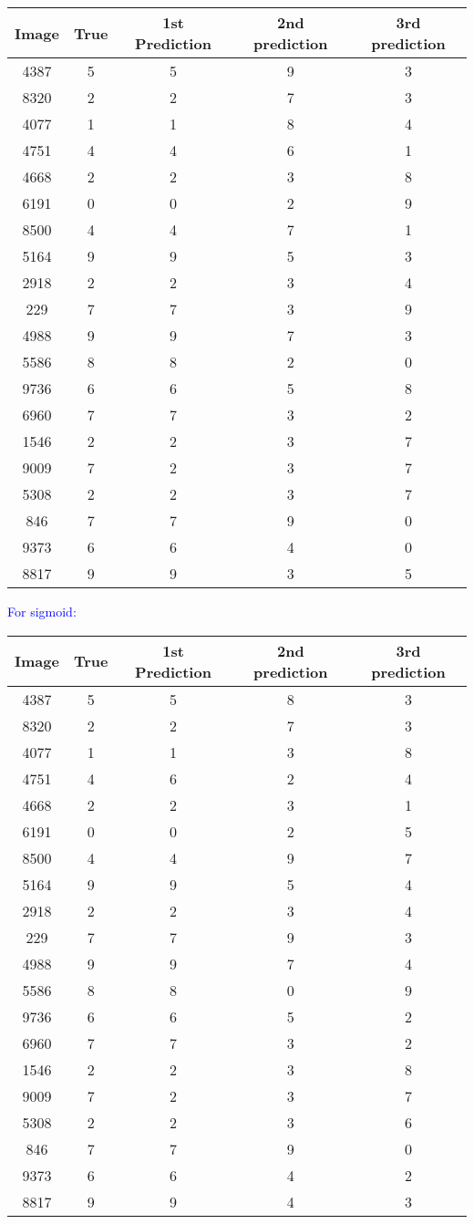 \documentclass[12pt,a4paper]{article}
\newenvironment{QandA}{\begin{enumerate}[label=\bfseries\alph*.]\bfseries}
                      {\end{enumerate}}
\newenvironment{answered}{\par\normalfont}{}
\begin{document}
\begin{QandA}
\begin{answered}
\begin{center}
 \begin{tabular}{||c c c c c||} 
 \hline
 Image & True & 1st Prediction & 2nd prediction & 3rd prediction \\ [0.5ex] 
 \hline\hline
4387&5&5&9&3\\
8320&2&2&7&3\\
4077&1&1&8&4\\
4751&4&4&6&1\\
4668&2&2&3&8\\
6191&0&0&2&9\\
8500&4&4&7&1\\
5164&9&9&5&3\\
2918&2&2&3&4\\
229&7&7&3&9\\
4988&9&9&7&3\\
5586&8&8&2&0\\
9736&6&6&5&8\\
6960&7&7&3&2\\
1546&2&2&3&7\\
9009&7&2&3&7\\
5308&2&2&3&7\\
846&7&7&9&0\\
9373&6&6&4&0\\
8817&9&9&3&5\\
 \hline
\end{tabular}
\end{center}

\textcolor{blue}{For sigmoid:}
\begin{center}
 \begin{tabular}{||c c c c c||} 
 \hline
 Image & True & 1st Prediction & 2nd prediction & 3rd prediction \\ [0.5ex] 
 \hline\hline
4387& 5& 5& 8& 3\\
8320&2&2&7&3\\
4077&1&1&3&8\\
4751&4&6&2&4\\
4668&2&2&3&1\\
6191&0&0&2&5\\
8500&4&4&9&7\\
5164&9&9&5&4\\
2918&2&2&3&4\\
229&7&7&9&3\\
4988&9&9&7&4\\
5586&8&8&0&9\\
9736&6&6&5&2\\
6960&7&7&3&2\\
1546&2&2&3&8\\
9009&7&2&3&7\\
5308&2&2&3&6\\
846&7&7&9&0\\
9373&6&6&4&2\\
8817&9&9&4&3\\
 \hline
\end{tabular}
\end{center}



         \end{answered}
\end{QandA}
\end{document}

